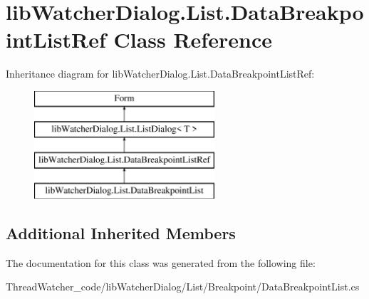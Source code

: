 \hypertarget{classlib_watcher_dialog_1_1_list_1_1_data_breakpoint_list_ref}{\section{lib\+Watcher\+Dialog.\+List.\+Data\+Breakpoint\+List\+Ref Class Reference}
\label{classlib_watcher_dialog_1_1_list_1_1_data_breakpoint_list_ref}
}
Inheritance diagram for lib\+Watcher\+Dialog.\+List.\+Data\+Breakpoint\+List\+Ref\+:\begin{figure}[H]
\begin{center}
\leavevmode
\includegraphics[height=4.000000cm]{classlib_watcher_dialog_1_1_list_1_1_data_breakpoint_list_ref}
\end{center}
\end{figure}
\subsection*{Additional Inherited Members}


The documentation for this class was generated from the following file\+:\begin{DoxyCompactItemize}
\item 
Thread\+Watcher\+\_\+code/lib\+Watcher\+Dialog/\+List/\+Breakpoint/Data\+Breakpoint\+List.\+cs\end{DoxyCompactItemize}
